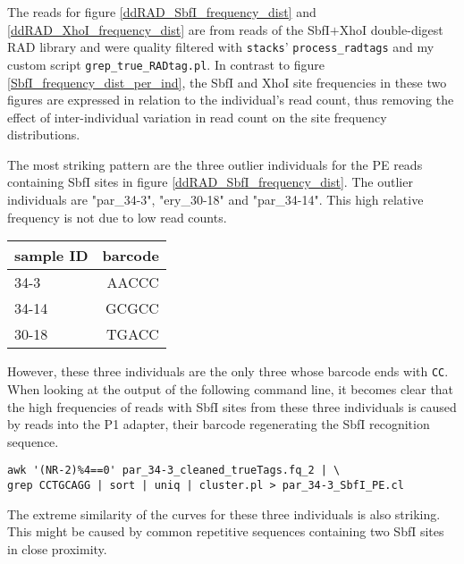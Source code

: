 \documentclass[a4paper,12pt,times,authoryear,twoside,print,index]{Classes/PhDThesisPSnPDF}\usepackage[]{graphicx}\usepackage[]{color}
\begin{document}
The reads for figure \ref{ddRAD_SbfI_frequency_dist} and \ref{ddRAD_XhoI_frequency_dist} are from reads of the SbfI$+$XhoI double-digest RAD library and were quality filtered with \texttt{stacks}' \texttt{process\_radtags} and my custom script \texttt{grep\_true\_RADtag.pl}. In contrast to figure \ref{SbfI_frequency_dist_per_ind}, the SbfI and XhoI site frequencies in these two figures are expressed in relation to the individual's read count, thus removing the effect of inter-individual variation in read count on the site frequency distributions.

The most striking pattern are the three outlier individuals for the PE reads containing SbfI sites in figure \ref{ddRAD_SbfI_frequency_dist}. The outlier individuals are "par\_34-3", "ery\_30-18" and "par\_34-14". This high relative frequency is not due to low read counts.
%
\begin{center}
\begin{tabular}{lr}
\toprule
sample ID & barcode\\
\midrule
34-3 & AACCC  \\
34-14 & GCGCC  \\
30-18 & TGACC  \\
\bottomrule
\end{tabular}
\end{center}
%
However, these three individuals are the only three whose barcode ends with \texttt{CC}. When looking at the output of the following command line, it becomes clear that the high frequencies of reads with SbfI sites from these three individuals is caused by reads into the P1 adapter, their barcode regenerating the SbfI recognition sequence.
%
\begin{Verbatim}[formatcom=\color{darkgray}, fontsize=\scriptsize]
awk '(NR-2)%4==0' par_34-3_cleaned_trueTags.fq_2 | \
grep CCTGCAGG | sort | uniq | cluster.pl > par_34-3_SbfI_PE.cl
\end{Verbatim}
%
The extreme similarity of the curves for these three individuals is also striking. This might be caused by common repetitive sequences containing two SbfI sites in close proximity.
\end{document}
